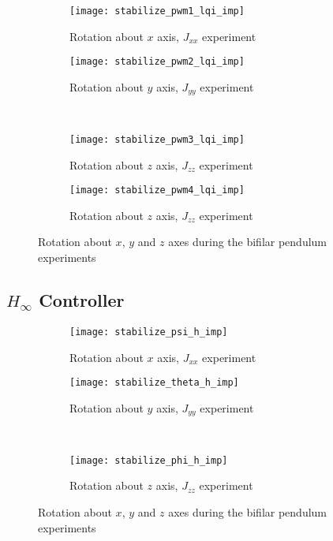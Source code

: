 \begin{appendices}
\begin{figure}[H]
\begin{subfigure}{.5\linewidth}
\centering
\texttt{[image: stabilize\_pwm1\_lqi\_imp]}
\caption{Rotation about $x$ axis, $J_{xx}$ experiment}
\label{fig:stabilize_pwm_lqi_imp}
\end{subfigure}%
\begin{subfigure}{.5\linewidth}
\centering
\texttt{[image: stabilize\_pwm2\_lqi\_imp]}
\caption{Rotation about $y$ axis, $J_{yy}$ experiment}
\label{fig:stabilize_pwm2_lqi_imp}
\end{subfigure}\\[1ex]
\begin{subfigure}{0.5\linewidth}
\centering
\texttt{[image: stabilize\_pwm3\_lqi\_imp]}
\caption{Rotation about $z$ axis, $J_{zz}$ experiment}
\label{fig:stabilize_pwm3_lqi_imp}
\end{subfigure}
\begin{subfigure}{0.5\linewidth}
\centering
\texttt{[image: stabilize\_pwm4\_lqi\_imp]}
\caption{Rotation about $z$ axis, $J_{zz}$ experiment}
\label{fig:stabilize_pwm4_lqi_imp}
\end{subfigure}
\caption{Rotation about $x$, $y$ and $z$ axes during the bifilar pendulum experiments}
\label{fig:stabilize_pwm_lqi}
\end{figure}

\subsection*{$H_\infty$ Controller}

\begin{figure}[H]
\begin{subfigure}{.5\linewidth}
\centering
\texttt{[image: stabilize\_psi\_h\_imp]}
\caption{Rotation about $x$ axis, $J_{xx}$ experiment}
\label{fig:stabilize_psi_h_imp}
\end{subfigure}%
\begin{subfigure}{.5\linewidth}
\centering
\texttt{[image: stabilize\_theta\_h\_imp]}
\caption{Rotation about $y$ axis, $J_{yy}$ experiment}
\label{fig:stabilize_theta_h_imp}
\end{subfigure}\\[1ex]
\begin{subfigure}{\linewidth}
\centering
\texttt{[image: stabilize\_phi\_h\_imp]}
\caption{Rotation about $z$ axis, $J_{zz}$ experiment}
\label{fig:stabilize_psi_h_imp}
\end{subfigure}
\caption{Rotation about $x$, $y$ and $z$ axes during the bifilar pendulum experiments}
\label{fig:stabilize_h_imp}
\end{figure}


\end{appendices}

